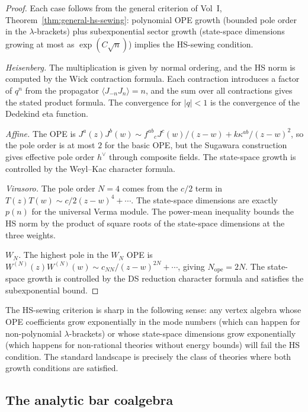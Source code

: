\begin{proof}
Each case follows from the general criterion of
Vol~I, Theorem~\ref*{thm:general-hs-sewing}:
polynomial OPE growth (bounded pole order in the $\lambda$-brackets)
plus subexponential sector growth (state-space dimensions growing at most
as $\exp(C\sqrt{n})$) implies the HS-sewing condition.

\emph{Heisenberg.} The multiplication is given by normal ordering, and the
HS norm is computed by the Wick contraction formula. Each contraction
introduces a factor of $q^n$ from the propagator $\langle J_{-n} J_n\rangle
= n$, and the sum over all contractions gives the stated product formula.
The convergence for $|q| < 1$ is the convergence of the Dedekind eta
function.

\emph{Affine.} The OPE is $J^a(z)J^b(w) \sim
f^{ab}{}_c J^c(w)/(z-w) + k\kappa^{ab}/(z-w)^2$, so the pole order
is at most $2$ for the basic OPE, but the Sugawara construction gives
effective pole order $h^\vee$ through composite fields. The state-space
growth is controlled by the Weyl--Kac character formula.

\emph{Virasoro.} The pole order $N=4$ comes from the $c/2$ term in
$T(z)T(w) \sim c/2(z-w)^4 + \cdots$. The state-space dimensions are
exactly $p(n)$ for the universal Verma module. The power-mean inequality
bounds the HS norm by the product of square roots of the state-space
dimensions at the three weights.

\emph{$W_N$.} The highest pole in the $W_N$ OPE is
$W^{(N)}(z)W^{(N)}(w) \sim c_{NN}/(z-w)^{2N} + \cdots$, giving
$N_{\mathrm{ope}} = 2N$. The state-space growth is controlled by the
DS reduction character formula and satisfies the subexponential bound.
\end{proof}

\begin{remark}
The HS-sewing criterion is sharp in the following sense: any vertex algebra
whose OPE coefficients grow exponentially in the mode numbers (which can
happen for non-polynomial $\lambda$-brackets) or whose state-space
dimensions grow exponentially (which happens for non-rational theories
without energy bounds) will fail the HS condition. The standard landscape
is precisely the class of theories where both growth conditions are
satisfied.
\end{remark}

\subsection{The analytic bar coalgebra}

